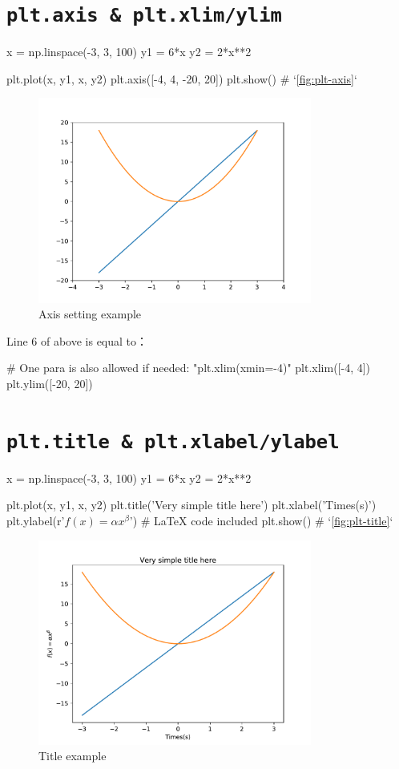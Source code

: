 \documentclass{report}
\begin{document}
\section{\texttt{plt.axis \& plt.xlim/ylim}}
\begin{py}
x = np.linspace(-3, 3, 100)
y1 = 6*x
y2 = 2*x**2

plt.plot(x, y1, x, y2)
plt.axis([-4, 4, -20, 20])
plt.show() # `\autoref{fig:plt-axis}`
\end{py}

\begin{figure}[!htb]
  \centering
  \includegraphics[width=90mm]{plt-axis}
  \caption{Axis setting example}
  \label{fig:plt-axis}
\end{figure}

Line 6 of above is equal to：
\begin{py}
# One para is also allowed if needed: "plt.xlim(xmin=-4)"
plt.xlim([-4, 4]) 
plt.ylim([-20, 20])
\end{py}

\section{\texttt{plt.title \& plt.xlabel/ylabel}}
\begin{py}
x = np.linspace(-3, 3, 100)
y1 = 6*x
y2 = 2*x**2

plt.plot(x, y1, x, y2)
plt.title('Very simple title here')
plt.xlabel('Times(s)')
plt.ylabel(r'$f(x)=\alpha x^{\beta}$') # LaTeX code included
plt.show() # `\autoref{fig:plt-title}`
\end{py}

\begin{figure}[!htb]
  \centering
  \includegraphics[width=90mm]{plt-title}
  \caption{Title example}
  \label{fig:plt-title}
\end{figure}
\end{document}
